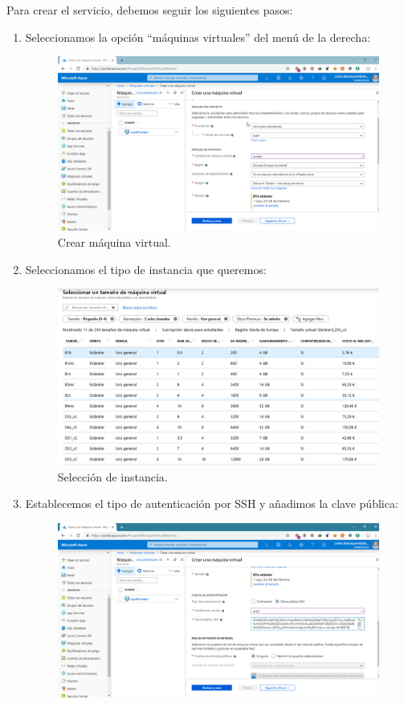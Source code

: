 Para crear el servicio, debemos seguir los siguientes pasos:
\begin{enumerate}
	\item Seleccionamos la opción ``máquinas virtuales'' del menú de la derecha:
	\begin{figure}[h]
		\centering
		\includegraphics[scale=0.35]{ImagenesAzure/MV/1.png}
		\caption{Crear máquina virtual.}
		\label{Crear máquina virtual}
	\end{figure}
\newpage
	\item Seleccionamos el tipo de instancia que queremos:
	\begin{figure}[h]
		\centering
		\includegraphics[scale=0.35]{ImagenesAzure/MV/1medio.png}
		\caption{Selección de instancia.}
		\label{Selección de instancia2}
	\end{figure}
	\item Establecemos el tipo de autenticación por SSH y añadimos la clave pública:
	\begin{figure}[h]
		\centering
		\includegraphics[scale=0.35]{ImagenesAzure/MV/2.png}

\end{figure}
\end{enumerate}
